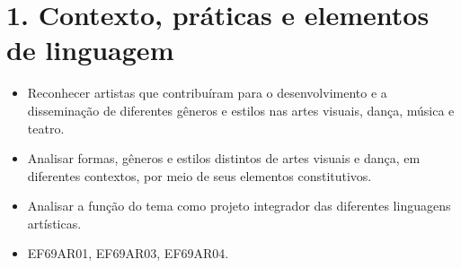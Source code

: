 \chapter{1. Contexto, práticas e elementos de linguagem}


\begin{itemize}
  \item Reconhecer artistas que contribuíram para o desenvolvimento e a disseminação de diferentes gêneros e estilos nas artes visuais, dança, música e teatro.
  \item Analisar formas, gêneros e estilos distintos de artes visuais e dança, em diferentes contextos, por meio de seus elementos constitutivos.
  \item Analisar a função do tema como projeto integrador das diferentes linguagens artísticas.
\end{itemize}


\begin{itemize}
  \item EF69AR01, EF69AR03, EF69AR04.
\end{itemize}


